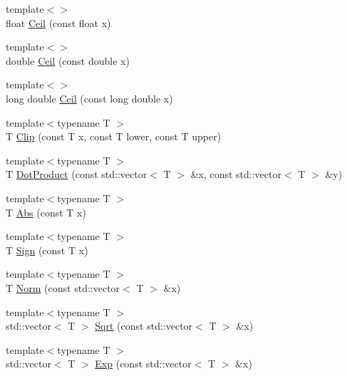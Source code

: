\begin{DoxyCompactItemize}
\item 
{\footnotesize template$<$$>$ }\\float \hyperlink{centroidalifold_2contrafold_2_utilities_8ipp_af7a641a4f57fdc795c681a94af7b17e3}{Ceil} (const float x)
\item 
{\footnotesize template$<$$>$ }\\double \hyperlink{centroidalifold_2contrafold_2_utilities_8ipp_a79a897daf89a92e047c2b6e61a7d4346}{Ceil} (const double x)
\item 
{\footnotesize template$<$$>$ }\\long double \hyperlink{centroidalifold_2contrafold_2_utilities_8ipp_a64a35b37618ffed226bdac8787a901af}{Ceil} (const long double x)
\item 
{\footnotesize template$<$typename T $>$ }\\T \hyperlink{centroidalifold_2contrafold_2_utilities_8ipp_a320ef704643929c4107b9cf524fbef6c}{Clip} (const T x, const T lower, const T upper)
\item 
{\footnotesize template$<$typename T $>$ }\\T \hyperlink{centroidalifold_2contrafold_2_utilities_8ipp_a4bb1be5baf8e6b84d08b0d3a6f19ec60}{Dot\+Product} (const std\+::vector$<$ T $>$ \&x, const std\+::vector$<$ T $>$ \&y)
\item 
{\footnotesize template$<$typename T $>$ }\\T \hyperlink{centroidalifold_2contrafold_2_utilities_8ipp_afaa054e15f31737d6061c62a24c9ad54}{Abs} (const T x)
\item 
{\footnotesize template$<$typename T $>$ }\\T \hyperlink{centroidalifold_2contrafold_2_utilities_8ipp_a797eeaa74fbdca4a7644e4c0f306f1dc}{Sign} (const T x)
\item 
{\footnotesize template$<$typename T $>$ }\\T \hyperlink{centroidalifold_2contrafold_2_utilities_8ipp_a84154107c2a94a052bf6e096e947746c}{Norm} (const std\+::vector$<$ T $>$ \&x)
\item 
{\footnotesize template$<$typename T $>$ }\\std\+::vector$<$ T $>$ \hyperlink{centroidalifold_2contrafold_2_utilities_8ipp_af7c1cc7b0896db3c539b96deb7180fa6}{Sqrt} (const std\+::vector$<$ T $>$ \&x)
\item 
{\footnotesize template$<$typename T $>$ }\\std\+::vector$<$ T $>$ \hyperlink{centroidalifold_2contrafold_2_utilities_8ipp_abc9676247707551f952b0fa97656939b}{Exp} (const std\+::vector$<$ T $>$ \&x)

\end{DoxyCompactItemize}
